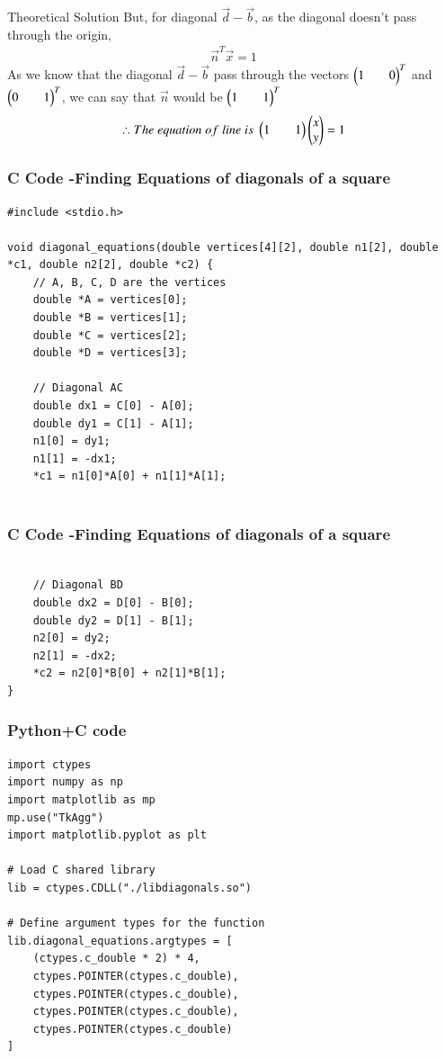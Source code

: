 \documentclass{beamer}
\begin{document}
\begin{frame}{Theoretical Solution}
But, for diagonal $\vec{d}-\vec{b}$, as the diagonal doesn't pass through the origin,
\begin{align*}
    \vec{n}^T\vec{x}=1
\end{align*}
As we know that the diagonal $\vec{d}-\vec{b}$ pass through the vectors $\begin{pmatrix}1&&0\end{pmatrix}^T$ and $\begin{pmatrix}0&&1\end{pmatrix}^T$, we can say that $\vec{n}$ would be $\begin{pmatrix}1&&1\end{pmatrix}^T$ 
\begin{align*}
    \therefore The\;equation\;of\;line\;is\;\begin{pmatrix}1&&1\end{pmatrix}\begin{pmatrix}x\\y\end{pmatrix}=1
\end{align*}
\end{frame}

\begin{frame}[fragile]
    \frametitle{C Code -Finding Equations of diagonals of a square}

    \begin{lstlisting}
#include <stdio.h>

void diagonal_equations(double vertices[4][2], double n1[2], double *c1, double n2[2], double *c2) {
    // A, B, C, D are the vertices
    double *A = vertices[0];
    double *B = vertices[1];
    double *C = vertices[2];
    double *D = vertices[3];

    // Diagonal AC
    double dx1 = C[0] - A[0];
    double dy1 = C[1] - A[1];
    n1[0] = dy1;
    n1[1] = -dx1;
    *c1 = n1[0]*A[0] + n1[1]*A[1];


    \end{lstlisting}
\end{frame}

\begin{frame}[fragile]
    \frametitle{C Code -Finding Equations of diagonals of a square}

    \begin{lstlisting}

    // Diagonal BD
    double dx2 = D[0] - B[0];
    double dy2 = D[1] - B[1];
    n2[0] = dy2;
    n2[1] = -dx2;
    *c2 = n2[0]*B[0] + n2[1]*B[1];
}
    \end{lstlisting}
\end{frame}


\begin{frame}[fragile]
    \frametitle{Python+C code}

    \begin{lstlisting}
import ctypes
import numpy as np
import matplotlib as mp
mp.use("TkAgg")
import matplotlib.pyplot as plt

# Load C shared library
lib = ctypes.CDLL("./libdiagonals.so")

# Define argument types for the function
lib.diagonal_equations.argtypes = [
    (ctypes.c_double * 2) * 4,
    ctypes.POINTER(ctypes.c_double),
    ctypes.POINTER(ctypes.c_double),
    ctypes.POINTER(ctypes.c_double),
    ctypes.POINTER(ctypes.c_double)
]

    \end{lstlisting}
\end{frame}
\end{document}
